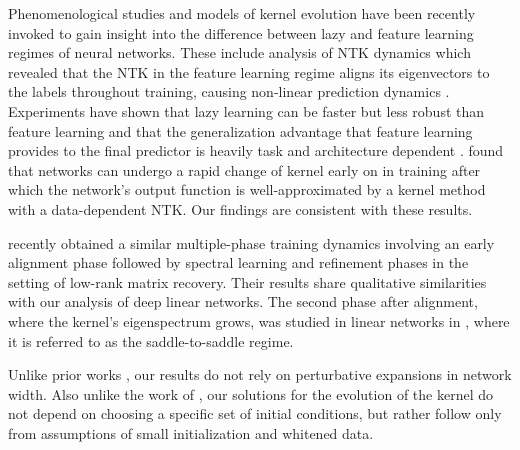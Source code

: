 \documentclass{article} %
\begin{document}
Phenomenological studies and models of kernel evolution have been recently invoked to gain insight into the difference between lazy and feature learning regimes of neural networks. These include analysis of NTK dynamics which revealed that the NTK in the feature learning regime aligns its eigenvectors to the labels throughout training, causing non-linear prediction dynamics \citep{fort2020deep, Baratin2021ImplicitRV, shan2021rapid, woodworth, chen2020labelaware, GEIGER20211, bai2020taylorized}.  Experiments have shown that lazy learning can be faster but less robust than feature learning \citep{Flesch} and that the generalization advantage that feature learning provides to the final predictor is heavily task and architecture dependent \citep{lee2020finite}. \cite{fort2020deep} found that networks can undergo a rapid change of kernel early on in training after which the network's output function is well-approximated by a kernel method with a data-dependent NTK. Our findings are consistent with these results.

\cite{stoger2021small} recently obtained a similar multiple-phase training dynamics involving an early alignment phase followed by spectral learning and refinement phases in the setting of low-rank matrix recovery. Their results share qualitative similarities with our analysis of deep linear networks. The second phase after alignment, where the kernel's eigenspectrum grows, was studied in linear networks in \citep{jacot2021deep}, where it is referred to as the saddle-to-saddle regime. 

Unlike prior works \citep{Dyer2020Asymptotics, Aitken2020OnTA, Andreassen2020AsymptoticsOW}, our results do not rely on perturbative expansions in network width. Also unlike the work of \cite{Saxe14exactsolutions}, our solutions for the evolution of the kernel do not depend on choosing a specific set of initial conditions, but rather follow only from assumptions of small initialization and whitened data.
\end{document}
